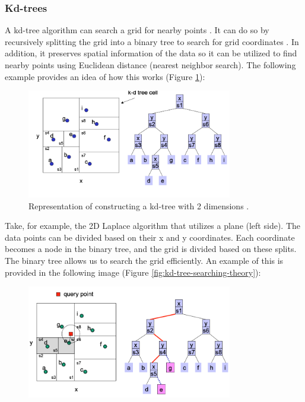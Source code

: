{\subsubsection*{Kd-trees} \label{theory:kd-trees}
A kd-tree algorithm can search a grid for nearby points \citep{bentley_multidimensional_1975}.
It can do so by recursively splitting the grid into a binary tree to search for grid coordinates \citep{washington_k-d_2002}.
In addition, it preserves spatial information of the data so it can be utilized to find nearby points using Euclidean distance (nearest neighbor search).
The following example provides an idea of how this works (Figure \ref{fig:kd-tree-theory}):
\begin{figure}[H]
  \includegraphics[width=0.8\textwidth]{TheorethicalFramework/ND-Laplace/Images/kd-tree-part1.png}
  \caption{Representation of constructing a kd-tree with 2 dimensions \citep{washington_k-d_2002}.}
  \label{fig:kd-tree-theory}
\end{figure}
Take, for example, the 2D Laplace algorithm that utilizes a plane (left side).
The data points can be divided based on their x and y coordinates.
Each coordinate becomes a node in the binary tree, and the grid is divided based on these splits.
The binary tree allows us to search the grid efficiently.
An example of this is provided in the following image (Figure \ref{fig:kd-tree-searching-theory}):
\begin{figure}[H]
  \includegraphics[width=0.8\textwidth]{TheorethicalFramework/ND-Laplace/Images/kd-tree-part2.png}

\end{figure}}
